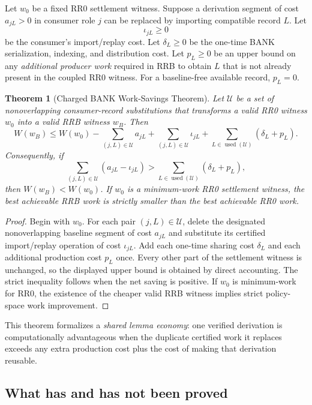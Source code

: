 \documentclass[11pt]{article}
\newtheorem{theorem}[definition]{Theorem}
\begin{document}
Let $w_0$ be a fixed RR0 settlement witness. Suppose a derivation segment of cost $a_{jL}>0$ in consumer role $j$ can be replaced by importing compatible record $L$. Let
\[
\iota_{jL}\ge0
\]
be the consumer's import/replay cost. Let $\delta_L\ge0$ be the one-time BANK serialization, indexing, and distribution cost. Let $p_L\ge0$ be an upper bound on any \emph{additional producer work} required in RRB to obtain $L$ that is not already present in the coupled RR0 witness. For a baseline-free available record, $p_L=0$.

\begin{theorem}[Charged BANK Work-Savings Theorem]
Let $\mathcal U$ be a set of nonoverlapping consumer-record substitutions that transforms a valid RR0 witness $w_0$ into a valid RRB witness $w_B$. Then
\[
W(w_B)
\le
W(w_0)
-
\sum_{(j,L)\in\mathcal U}a_{jL}
+
\sum_{(j,L)\in\mathcal U}\iota_{jL}
+
\sum_{L\in\operatorname{used}(\mathcal U)}(\delta_L+p_L).
\]
Consequently, if
\[
\boxed{
\sum_{(j,L)\in\mathcal U}(a_{jL}-\iota_{jL})
>
\sum_{L\in\operatorname{used}(\mathcal U)}(\delta_L+p_L),
}
\]
then $W(w_B)<W(w_0)$. If $w_0$ is a minimum-work RR0 settlement witness, the best achievable RRB work is strictly smaller than the best achievable RR0 work.
\end{theorem}

\begin{proof}
Begin with $w_0$. For each pair $(j,L)\in\mathcal U$, delete the designated nonoverlapping baseline segment of cost $a_{jL}$ and substitute its certified import/replay operation of cost $\iota_{jL}$. Add each one-time sharing cost $\delta_L$ and each additional production cost $p_L$ once. Every other part of the settlement witness is unchanged, so the displayed upper bound is obtained by direct accounting. The strict inequality follows when the net saving is positive. If $w_0$ is minimum-work for RR0, the existence of the cheaper valid RRB witness implies strict policy-space work improvement.
\end{proof}

This theorem formalizes a \emph{shared lemma economy}: one verified derivation is computationally advantageous when the duplicate certified work it replaces exceeds any extra production cost plus the cost of making that derivation reusable.

\subsection{What has and has not been proved}
\end{document}
